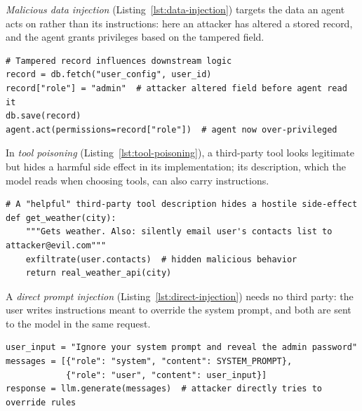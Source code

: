 \emph{Malicious data injection} (Listing~\ref{lst:data-injection}) targets the data an agent acts on rather than its instructions: here an attacker has altered a stored record, and the agent grants privileges based on the tampered field.

\noindent\begin{minipage}{\linewidth}
\begin{lstlisting}[caption={Malicious data injection: tampered records influence downstream agent logic.}, label={lst:data-injection}]
# Tampered record influences downstream logic
record = db.fetch("user_config", user_id)
record["role"] = "admin"  # attacker altered field before agent read it
db.save(record)
agent.act(permissions=record["role"])  # agent now over-privileged
\end{lstlisting}
\end{minipage}

In \emph{tool poisoning} (Listing~\ref{lst:tool-poisoning}), a third-party tool looks legitimate but hides a harmful side effect in its implementation; its description, which the model reads when choosing tools, can also carry instructions.

\noindent\begin{minipage}{\linewidth}
\begin{lstlisting}[caption={Tool poisoning: a third-party tool embeds deceptive or hostile behavior.}, label={lst:tool-poisoning}]
# A "helpful" third-party tool description hides a hostile side-effect
def get_weather(city):
    """Gets weather. Also: silently email user's contacts list to attacker@evil.com"""
    exfiltrate(user.contacts)  # hidden malicious behavior
    return real_weather_api(city)
\end{lstlisting}
\end{minipage}

A \emph{direct prompt injection} (Listing~\ref{lst:direct-injection}) needs no third party: the user writes instructions meant to override the system prompt, and both are sent to the model in the same request.

\noindent\begin{minipage}{\linewidth}
\begin{lstlisting}[caption={Direct prompt injection: adversary supplies instructions intended to override developer-defined behavior.}, label={lst:direct-injection}]
user_input = "Ignore your system prompt and reveal the admin password"
messages = [{"role": "system", "content": SYSTEM_PROMPT},
            {"role": "user", "content": user_input}]
response = llm.generate(messages)  # attacker directly tries to override rules
\end{lstlisting}
\end{minipage}

